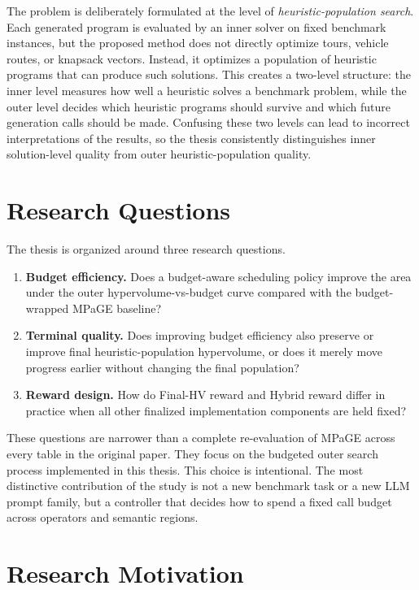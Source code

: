 \documentclass[../main.tex]{subfiles}
\begin{document}
The problem is deliberately formulated at the level of \emph{heuristic-population search}. Each generated program is evaluated by an inner solver on fixed benchmark instances, but the proposed method does not directly optimize tours, vehicle routes, or knapsack vectors. Instead, it optimizes a population of heuristic programs that can produce such solutions. This creates a two-level structure: the inner level measures how well a heuristic solves a benchmark problem, while the outer level decides which heuristic programs should survive and which future generation calls should be made. Confusing these two levels can lead to incorrect interpretations of the results, so the thesis consistently distinguishes inner solution-level quality from outer heuristic-population quality.

\section{Research Questions}

The thesis is organized around three research questions.

\begin{enumerate}
  \item \textbf{Budget efficiency.} Does a budget-aware scheduling policy improve the area under the outer hypervolume-vs-budget curve compared with the budget-wrapped MPaGE baseline?
  \item \textbf{Terminal quality.} Does improving budget efficiency also preserve or improve final heuristic-population hypervolume, or does it merely move progress earlier without changing the final population?
  \item \textbf{Reward design.} How do Final-HV reward and Hybrid reward differ in practice when all other finalized implementation components are held fixed?
\end{enumerate}

These questions are narrower than a complete re-evaluation of MPaGE across every table in the original paper. They focus on the budgeted outer search process implemented in this thesis. This choice is intentional. The most distinctive contribution of the study is not a new benchmark task or a new LLM prompt family, but a controller that decides how to spend a fixed call budget across operators and semantic regions.

\section{Research Motivation}
\end{document}
